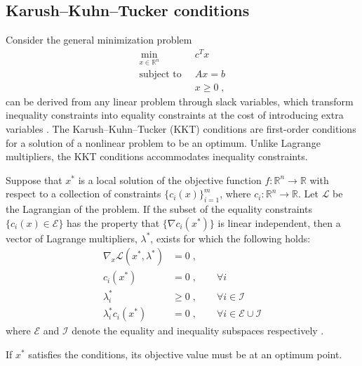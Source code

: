 \subsection{Karush–Kuhn–Tucker conditions}
Consider the general minimization problem
 \begin{align}
	\min_{x \in \mathbb{R}^n} \;  & \; c^T x \label{eq:LinOptProb} \\
	\text{subject to} \;  & \; A x = b  \nonumber \\ 
							& \; x \geq 0 \nonumber \; ,
\end{align}
can be derived from any linear problem through slack variables, which transform inequality constraints into equality constraints at the cost of introducing extra variables \cite{ipopt}.
The Karush–Kuhn–Tucker (KKT) conditions are first-order conditions for a solution of a nonlinear problem to be an optimum. Unlike Lagrange multipliers, the KKT conditions accommodates inequality constraints.
\begin{theorem}
	Suppose that $x^*$ is a local solution of the objective function $f  :  \mathbb{R}^n \to \mathbb{R}$ with respect to a collection of constraints $\{ c_i(x)  \}_{i=1}^{m}$, where $c_i :  \mathbb{R}^n \to \mathbb{R}$. Let $\mathcal{L}$ be the Lagrangian of the problem. If the subset of the equality constraints $\{ c_i(x) \in \mathcal{E}\}$ has the property that $\{ \nabla c_i(x^*)\}$ is linear independent, then a vector of Lagrange multipliers, $\lambda^*$, exists for which the following holds:
	\begin{subequations}	
	\begin{align}
		\nabla_x \mathcal{L}(x^*,\lambda^*) &= 0 \; ,  \\
		c_i(x^*) &= 0 \; , \qquad \forall i \\
		\lambda_{i}^* &\geq 0 \; , \qquad \forall i \in \mathcal{I} \\
		\lambda_{i}^* c_i(x^*) &= 0 \; , \qquad \forall i \in \mathcal{E} \cup \mathcal{I}
	\end{align}
	\end{subequations}	
	where $\mathcal{E}$ and $\mathcal{I}$ denote the equality and inequality subspaces respectively \cite{wright}.  
\end{theorem}
If $x^*$ satisfies the conditions, its objective value must be at an optimum point.


